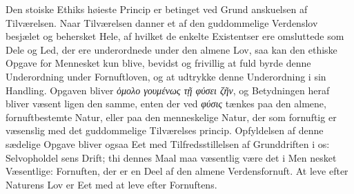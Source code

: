 \documentclass[12pt,a4paper]{book}
\newcommand{\gk}[1]{\textit{#1}}
\begin{document}
Den stoiske Ethiks høieste Princip er betinget ved Grund\-%
anskuelsen af Tilværelsen. Naar Tilværelsen danner et af den
guddommelige Verdenslov besjælet og behersket Hele, af hvilket
de enkelte Existentser ere omsluttede som Dele og Led, der
ere underordnede under den almene Lov, saa kan den ethiske
Opgave for Mennesket kun blive, bevidst og frivillig at fuld\-%
byrde denne Underordning under Fornuftloven, og at udtrykke
denne Underordning i sin Handling. Opgaven bliver \gk{ὁμολο\-%
γουμένως τῇ φύσει ζῆν}, og Betydningen heraf bliver væsent\-%
ligen den samme, enten der ved \gk{φύσις} tænkes paa den almene,
fornuftbestemte Natur, eller paa den menneskelige Natur, der
som fornuftig er væsenslig med det guddommelige Tilværelses\-%
princip. Opfyldelsen af denne sædelige Opgave bliver ogsaa
Eet med Tilfredsstillelsen af Grunddriften i os: Selvopholdel\-%
sens Drift; thi dennes Maal maa væsentlig være det i Men\-%
nesket Væsentlige: Fornuften, der er en Deel af den almene
Verdensfornuft. At leve efter Naturens Lov er Eet med at
leve efter Fornuftens.
\end{document}
